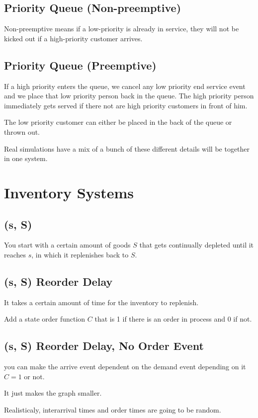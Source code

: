 \documentclass[fleqn]{report}
\begin{document}
\subsection{Priority Queue (Non-preemptive)}
Non-preemptive means if a low-priority is already in service, they will 
not be kicked out if a high-priority customer arrives. 

\subsection{Priority Queue (Preemptive)}
If a high priority enters the queue, we cancel any low priority end service 
event and we place that low priority person back in the queue. The high 
priority person immediately gets served if there not are high priority 
customers in front of him. 

The low priority customer can either be placed in the back of the 
queue or thrown out. 

Real simulations have a mix of a bunch of these different details 
will be together in one system. 

\section{Inventory Systems}
\subsection{(s, S)}
You start with a certain amount of goods $S$ that gets continually 
depleted until it reaches $s$, in which it replenishes back to $S$.


\subsection{(s, S) Reorder Delay}
It takes a certain amount of time for the inventory to replenish. 

Add a state order function $C$ that is 1 if there is an order in process 
and $0$ if not. 


\subsection{(s, S) Reorder Delay, No Order Event}
you can make the arrive event dependent on the demand event 
depending on it $C = 1$ or not. 

It just makes the graph smaller. 

Realisticaly, interarrival times and order times are going to be random. 
\end{document}
